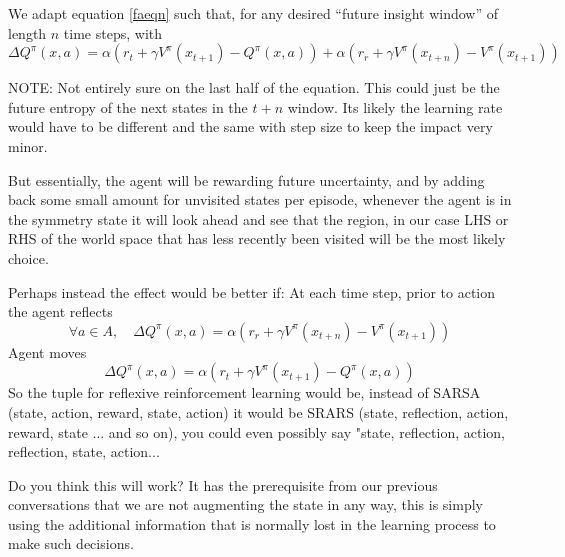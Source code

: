 \documentclass{article}
\begin{document}
We adapt equation \ref{faeqn} such that, for any desired ``future insight window'' of length $n$ time steps, with 
\begin{equation}
\Delta Q^{\pi}(x,a) = \alpha \left(r_t + \gamma V^{\pi}(x_{t+1}) -  Q^{\pi}(x,a) \right) + \alpha \left(r_r + \gamma V^{\pi}(x_{t+n}) - V^{\pi}(x_{t+1}) \right)
\end{equation}

NOTE: Not entirely sure on the last half of the equation. This could just be the future entropy of the next states in the $t+n$ window. Its likely the learning rate would have to be different and the same with step size to keep the impact very minor.

But essentially, the agent will be rewarding future uncertainty, and by adding back some small amount for unvisited states per episode, whenever the agent is in the symmetry state it will look ahead and see that the region, in our case LHS or RHS of the world space that has less recently been visited will be the most likely choice.

Perhaps instead the effect would be better if:
At each time step, prior to action the agent reflects
\begin{equation}
\forall a \in A, \quad \Delta Q^{\pi}(x,a) = \alpha \left(r_r + \gamma V^{\pi}(x_{t+n}) - V^{\pi}(x_{t+1}) \right)
\end{equation}
Agent moves
\begin{equation}
\Delta Q^{\pi}(x,a) = \alpha \left(r_t + \gamma V^{\pi}(x_{t+1}) -  Q^{\pi}(x,a) \right) 
\end{equation}
So the tuple for reflexive reinforcement learning would be, instead of SARSA (state, action, reward, state, action) it would be SRARS (state, reflection, action, reward, state ... and so on), you could even possibly say "state, reflection, action, reflection, state, action...

Do you think this will work? It has the prerequisite from our previous conversations that we are not augmenting the state in any way, this is simply using the additional information that is normally lost in the learning process to make such decisions.




\end{document}
